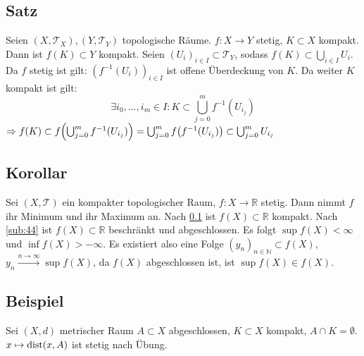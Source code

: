 \subsection[Satz: Das Bild einer kompakten Teilmenge ist kompakt]{Satz} %
\label{sub:49}
Seien $(X,\mathcal{T}_X), (Y, \mathcal{T}_Y)$ topologische Räume. $f : X \to Y$ stetig, $K \subset X$ kompakt. Dann ist $f(K) \subset Y$ kompakt.
Seien $(U_i)_{i \in I} \subset \mathcal{T}_Y$, sodass $f(K) \subset \bigcup_{i \in I} U_{i}$. Da $f$ stetig ist gilt: $(f ^{-1} (U_i))_{i \in I}$ ist offene Überdeckung 
von $K$. Da weiter $K$ kompakt ist gilt:
\[
	\exists i_0, \ldots , i_m \in I : K \subset \bigcup_{j=0}^m f ^{-1} ( U_{i_j})
\]
$\Rightarrow f(K) \subset f \enbrace*{\bigcup_{j=0}^m f ^{-1} ( U_{i_j})}  = \bigcup_{j=0}^m f \enbrace*{ f ^{-1} (U_{i_j})}  \subset \bigcup_{j=0}^m U_{i_j}$ \bewende

\subsection[Korollar: Auf kompakten topl. Räumen nimmt stetiges $f$ Minimum und Maximum an]{Korollar} %
\label{sub:410}
Sei $(X, \mathcal{T})$ ein kompakter topologischer Raum, $f : X \to \mathds{R}$ stetig. Dann nimmt $f$ ihr Minimum und ihr Maximum an.
Nach \ref{sub:49} ist $f(X) \subset \mathds{R}$ kompakt. Nach \ref{sub:44} ist $f(X) \subset \mathds{R}$ beschränkt und abgeschlossen. Es folgt $\sup f(X) < \infty$
und $\inf f(X) > - \infty$. Es existiert also eine Folge $(y_n)_{n \in \mathds{N}} \subset f(X)$, $y_n \xrightarrow{n \to \infty} \sup f(X)$, da $f(X)$ abgeschlossen ist,
ist $\sup f(X) \in f(X)$.

\subsection[Beispiel mit $\dist$]{Beispiel} %
\label{sub:411}
Sei $(X,d)$ metrischer Raum $A \subset X$ abgeschlossen, $K \subset X$ kompakt, $A \cap K = \emptyset$. $x \mapsto \operatorname{dist} (x,A)$ ist stetig nach Übung.

